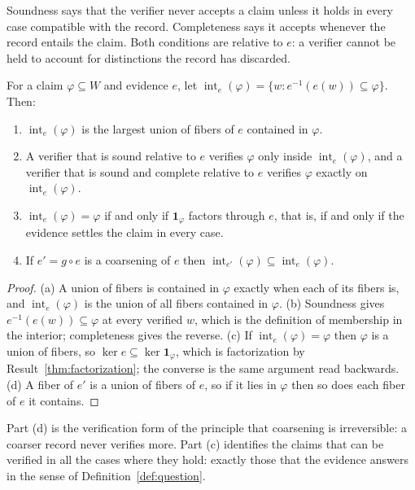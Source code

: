 Soundness says that the verifier never accepts a claim unless it holds in every case compatible with the record. Completeness says it accepts whenever the record entails the claim. Both conditions are relative to $e$: a verifier cannot be held to account for distinctions the record has discarded.

\begin{newresult}\label{prop:interior}
For a claim $\varphi\subseteq W$ and evidence $e$, let $\operatorname{int}_e(\varphi)=\{w:e^{-1}(e(w))\subseteq\varphi\}$. Then:
\begin{enumerate}[nosep,label=(\alph*)]
  \item $\operatorname{int}_e(\varphi)$ is the largest union of fibers of $e$ contained in $\varphi$.
  \item A verifier that is sound relative to $e$ verifies $\varphi$ only inside $\operatorname{int}_e(\varphi)$, and a verifier that is sound and complete relative to $e$ verifies $\varphi$ exactly on $\operatorname{int}_e(\varphi)$.
  \item $\operatorname{int}_e(\varphi)=\varphi$ if and only if $\mathbf 1_\varphi$ factors through $e$, that is, if and only if the evidence settles the claim in every case.
  \item If $e'=g\circ e$ is a coarsening of $e$ then $\operatorname{int}_{e'}(\varphi)\subseteq\operatorname{int}_e(\varphi)$.
\end{enumerate}
\end{newresult}
\begin{proof}
(a) A union of fibers is contained in $\varphi$ exactly when each of its fibers is, and $\operatorname{int}_e(\varphi)$ is the union of all fibers contained in $\varphi$. (b) Soundness gives $e^{-1}(e(w))\subseteq\varphi$ at every verified $w$, which is the definition of membership in the interior; completeness gives the reverse. (c) If $\operatorname{int}_e(\varphi)=\varphi$ then $\varphi$ is a union of fibers, so $\ker e\subseteq\ker\mathbf 1_\varphi$, which is factorization by Result~\ref{thm:factorization}; the converse is the same argument read backwards. (d) A fiber of $e'$ is a union of fibers of $e$, so if it lies in $\varphi$ then so does each fiber of $e$ it contains.
\end{proof}

Part (d) is the verification form of the principle that coarsening is irreversible: a coarser record never verifies more. Part (c) identifies the claims that can be verified in all the cases where they hold: exactly those that the evidence answers in the sense of Definition~\ref{def:question}.


